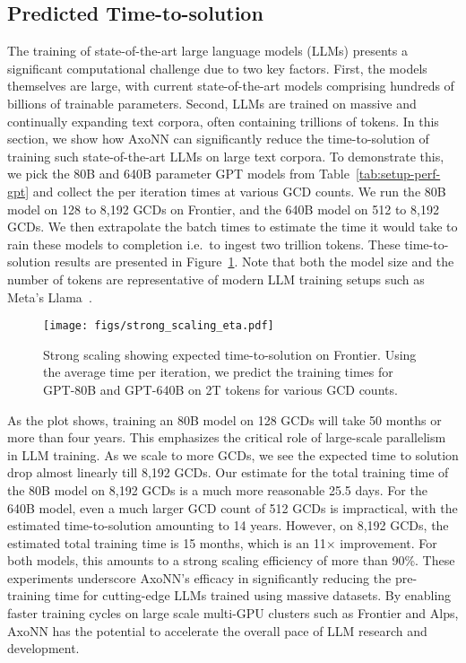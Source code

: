 \subsection{Predicted Time-to-solution}

The training of state-of-the-art large language models (LLMs) presents a
significant computational challenge due to two key factors. First, the models
themselves are large, with current state-of-the-art models comprising hundreds
of billions of trainable parameters. Second, LLMs are trained on massive and
continually expanding text corpora, often containing trillions of tokens. In
this section, we show how AxoNN can significantly reduce the time-to-solution
of training such state-of-the-art LLMs on large text corpora. To demonstrate
this, we pick the 80B and 640B parameter GPT models from
Table~\ref{tab:setup-perf-gpt} and collect the per iteration times at various
GCD counts.  We run the 80B model on 128 to 8,192 GCDs on Frontier, and the
640B model on 512 to 8,192 GCDs. We then extrapolate the batch times to
estimate the time it would take to rain these models to completion i.e.~to
ingest two trillion tokens.  These time-to-solution results are presented in
Figure~\ref{fig:strong}. Note that both the model size and the number of tokens
are representative of modern LLM training setups such as Meta's
Llama~\cite{touvron2023llama}. 

\begin{figure}[h]
  \centering
    \texttt{[image: figs/strong\_scaling\_eta.pdf]}
    \caption{Strong scaling showing expected time-to-solution on Frontier. Using the average time per iteration, we predict the 
    training times for GPT-80B and GPT-640B on 2T tokens for various GCD counts.}
    \label{fig:strong}
\end{figure}

As the plot shows, training an 80B model on 128 GCDs will take 50 months or
more than four years. This emphasizes the critical role of large-scale
parallelism in LLM training.  As we scale to more GCDs, we see the expected
time to solution drop almost linearly till 8,192 GCDs. Our estimate for the
total training time of the 80B model on 8,192 GCDs is a much more reasonable
25.5 days.  For the 640B model, even a much larger GCD count of 512 GCDs is
impractical, with the estimated time-to-solution amounting to 14 years.
However, on 8,192 GCDs, the estimated total training time is 15 months, which
is an 11$\times$ improvement.  For both models, this amounts to a strong
scaling efficiency of more than 90\%. These experiments underscore AxoNN's
efficacy in significantly reducing the pre-training time for cutting-edge LLMs
trained using massive datasets. By enabling faster training cycles on large
scale multi-GPU clusters such as Frontier and Alps, AxoNN has the potential to
accelerate the overall pace of LLM research and development.

